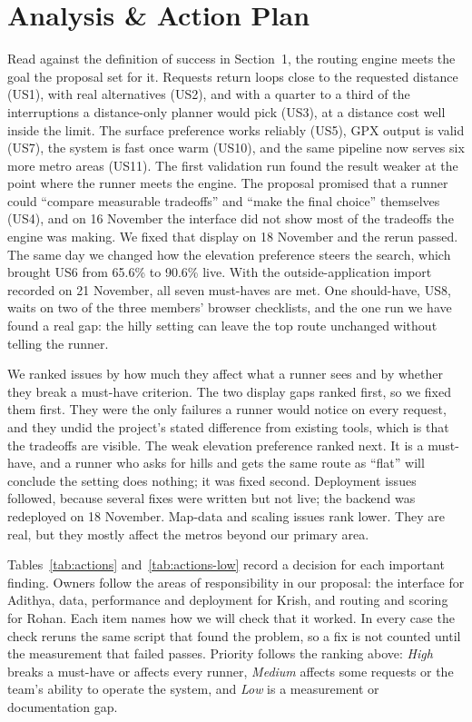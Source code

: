 \section{Analysis \& Action Plan}
\label{sec:analysis}

Read against the definition of success in Section~1, the routing engine meets the goal the proposal set for it. Requests return
loops close to the requested distance (US1), with real alternatives (US2), and
with a quarter to a third of the interruptions a distance-only planner would pick
(US3), at a distance cost well inside the limit. The surface preference works
reliably (US5), GPX output is valid (US7), the system is fast once warm
(US10), and the same pipeline now serves six more metro areas (US11). The
first validation run found the result weaker at the point where the runner
meets the engine. The proposal promised that a runner could ``compare
measurable tradeoffs'' and ``make the final choice'' themselves (US4), and on
16 November the interface did not show most of the tradeoffs the engine was
making. We fixed that display on 18 November and the rerun passed. The same
day we changed how the elevation preference steers the search, which brought
US6 from 65.6\% to 90.6\% live. With the outside-application import
recorded on 21 November, all seven must-haves are met. One should-have, US8,
waits on two of the three members' browser checklists, and the one run we
have found a real gap: the hilly setting can leave the top route unchanged
without telling the runner.

We ranked issues by how much they affect what a runner sees and by whether
they break a must-have criterion. The two display gaps ranked first, so we
fixed them first. They were the only failures a runner would notice on every
request, and they undid the project's stated difference from existing tools,
which is that the tradeoffs are visible. The weak elevation preference ranked
next. It is a must-have, and a runner who asks for hills and gets the same
route as ``flat'' will conclude the setting does nothing; it was fixed second.
Deployment issues followed, because several fixes were written but not live;
the backend was redeployed on 18 November. Map-data and scaling issues rank lower. They are
real, but they mostly affect the metros beyond our primary area.

Tables~\ref{tab:actions} and~\ref{tab:actions-low} record a decision for each important finding. Owners
follow the areas of responsibility in our proposal: the interface for
Adithya, data, performance and deployment for Krish, and routing and scoring
for Rohan. Each item names how we will check that it worked. In every case
the check reruns the same script that found the problem, so a fix is not
counted until the measurement that failed passes. Priority follows the
ranking above: \emph{High} breaks a must-have or affects every runner,
\emph{Medium} affects some requests or the team's ability to operate the
system, and \emph{Low} is a measurement or documentation gap.


